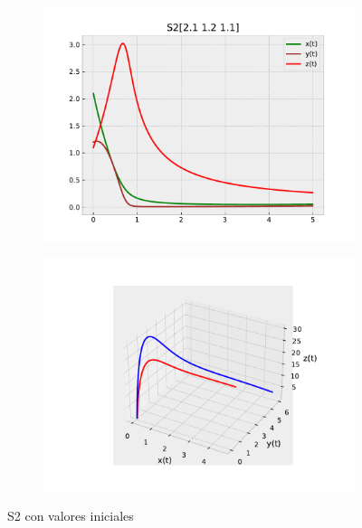 \documentclass{wscpaperproc}
\theoremstyle{wsc}
\begin{document}
\begin{figure}[h]
	\centering
	\begin{subfigure}[b]{0.5\textwidth}
		\centering
		\includegraphics[width=\textwidth]{Simulations/S2[2.1 1.2 1.1].pdf}
	
		\label{fig:comparativa61}
	\end{subfigure}%
	\begin{subfigure}[b]{0.5\textwidth}
		\centering
		\includegraphics[width=\textwidth]{Simulations/S13d.pdf}
		\label{fig:comparativa62}
	\end{subfigure}
	\caption{S2 con valores iniciales}

	\label{fig:comparacion7}
\end{figure}
\end{document}
